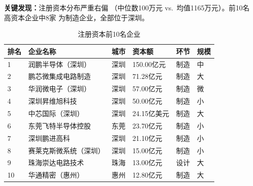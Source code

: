 \documentclass[12pt,a4paper]{article}
\newcommand{\tableHeaderRow}{\rowcolor{tealPrimary}\color{white}}
\newcommand{\tableOddRow}{\rowcolor{mintBG}}
\newcommand{\tableEvenRow}{\rowcolor{white}}
\begin{document}
\textbf{关键发现：}注册资本分布严重右偏
（中位数100万元 vs.\ 均值1165万元）。前10名高资本企业中8家
为制造企业，全部位于深圳。

\begin{table}[H]
\centering
\small
\caption{注册资本前10名企业}
\label{tab:capital_top10}
\begin{tabular}{llrlrl}
\toprule
\tableHeaderRow
\textbf{排名} & \textbf{企业名称} & \textbf{城市} & \textbf{资本额} & \textbf{环节} & \textbf{规模} \\
\midrule
\tableOddRow  1  & 润鹏半导体（深圳）          & 深圳 & 150.00亿元  & 制造 & 中 \\
\tableEvenRow 2  & 鹏芯微集成电路制造           & 深圳 & 71.28亿元   & 制造 & 大 \\
\tableOddRow  3  & 华润微电子（深圳）           & 深圳 & 57.00亿元   & 制造 & 微 \\
\tableEvenRow 4  & 深圳昇维旭科技              & 深圳 & 50.00亿元   & 制造 & 小 \\
\tableOddRow  5  & 中芯国际（深圳）            & 深圳 & 24.15亿美元  & 制造 & 大 \\
\tableEvenRow 6  & 东莞飞特半导体控股           & 东莞 & 23.70亿元   & 制造 & 小 \\
\tableOddRow  7  & 深圳鹏进高科              & 深圳 & 21.10亿元   & 制造 & 小 \\
\tableEvenRow 8  & 赛莱克斯微系统（深圳）       & 深圳 & 15.00亿元   & 制造 & 小 \\
\tableOddRow  9  & 珠海崇达电路技术           & 珠海 & 13.00亿元   & 设计 & 大 \\
\tableEvenRow 10 & 华通精密（惠州）            & 惠州 & 12.80亿元   & 制造 & 大 \\
\bottomrule
\end{tabular}
\end{table}
\end{document}

